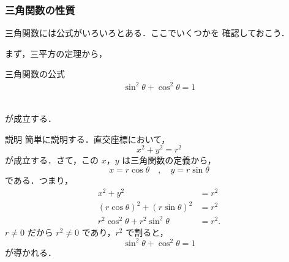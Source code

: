 \subsubsection{三角関数の性質}
    三角関数には公式がいろいろとある．ここでいくつかを
    確認しておこう．

    まず，三平方の定理から，\\

        \begin{itembox}[l]{三角関数の公式}
            \begin{align}
                \sin^{2} \theta  +  \cos^{2} \theta  =  1
            \end{align}
        \end{itembox}\\
    が成立する．

    \begin{mysmallsec}{説明}
        簡単に説明する．直交座標において，
            \begin{equation*}
                x^{2}  +  y^{2}  =  r^{2}
            \end{equation*}
        が成立する．さて，この $x$，$y$ は三角関数の定義から，
            \begin{equation*}
                x  =   r \cos \theta \quad, \quad y  =  r \sin \theta
            \end{equation*}
        である．つまり，
            \begin{align*}
                x^{2}  +  y^{2}  &=  r^{2} \\
                (r \cos \theta)^{2}  +  (r \sin \theta)^{2}  &=  r^{2} \\
                r^{2} \cos^{2} \theta  +  r^{2} \sin^{2} \theta  &=  r^{2}.
            \end{align*}
        $r\neq0$ だから $r^{2} \neq 0$ であり，$r^{2}$ で割ると，
            \begin{equation*}
                \sin^{2} \theta  +  \cos^{2} \theta  =  1
            \end{equation*}
        が導かれる．
    \end{mysmallsec}

